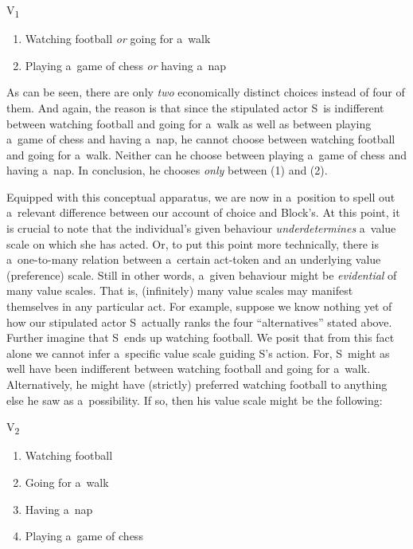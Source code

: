 V\textsubscript{1}



\begin{enumerate}

\item Watching football \textit{or} going for a~walk

\item Playing a~game of chess \textit{or} having a~nap

\end{enumerate}

As can be seen, there are only \textit{two} economically distinct choices instead of four of them. And again, the reason is that since the stipulated actor S~is indifferent between watching football and going for a~walk as well as between playing a~game of chess and having a~nap, he cannot choose between watching football and going for a~walk. Neither can he choose between playing a~game of chess and having a~nap. In conclusion, he chooses \textit{only} between (1) and (2).



Equipped with this conceptual apparatus, we are now in a~position to spell out a~relevant difference between our account of choice and Block's. At this point, it is crucial to note that the individual's given behaviour \textit{underdetermines} a~value scale on which she has acted. Or, to put this point more technically, there is a~one-to-many relation between a~certain act-token and an underlying value (preference) scale. Still in other words, a~given behaviour might be \textit{evidential} of many value scales. That is, (infinitely) many value scales may manifest themselves in any particular act. For example, suppose we know nothing yet of how our stipulated actor S~actually ranks the four ``alternatives'' stated above. Further imagine that S~ends up watching football. We posit that from this fact alone we cannot infer a~specific value scale guiding S's action. For, S~might as well have been indifferent between watching football and going for a~walk. Alternatively, he might have (strictly) preferred watching football to anything else he saw as a~possibility. If so, then his value scale might be the following:



V\textsubscript{2}



\begin{enumerate}

\item Watching football

\item Going for a~walk

\item Having a~nap

\item Playing a~game of chess

\end{enumerate}

